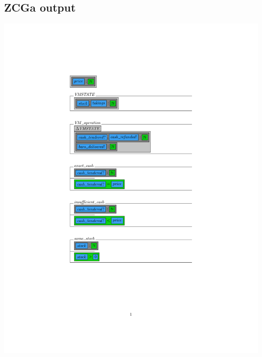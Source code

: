 \subsection{ZCGa output}
\label{app:vm1o}
\includegraphics[clip, trim=5cm 7cm 5cm 4.2cm]{examples/vm/1comp.pdf}

